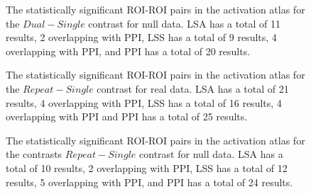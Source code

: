 \documentclass[phd,figures,tables,ackpage,abstractpage,publicabstractpage]{uithesis}
\begin{document}
\begin{figure}[H]
  \ContinuedFloat
  \centering


  \caption[All contrasts for all atlases for all data for LSA/LSS versus PPI continued...]{
      The statistically significant ROI-ROI pairs in the activation atlas
      for the $Dual - Single$ contrast for null data.
      LSA has a total of 11 results, 2 overlapping with PPI,
      LSS has a total of 9 results, 4 overlapping with PPI,
      and PPI has a total of 20 results.
  }
  \label{fig:data-null_type-brain_atlas-activation_contrast-dualxsingle}
\end{figure}

\begin{figure}[H]
  \ContinuedFloat
  \centering


  \caption[All contrasts for all atlases for all data for LSA/LSS versus PPI continued...]{
      The statistically significant ROI-ROI pairs in the activation atlas
      for the $Repeat - Single$ contrast for real data.
      LSA has a total of 21 results, 4 overlapping with PPI,
      LSS has a total of 16 results, 4 overlapping with PPI and
      PPI has a total of 25 results.
  }
  \label{fig:data-real_type-brain_atlas-activation_contrast-repeatxsingle}
\end{figure}

\begin{figure}[H]
  \ContinuedFloat
  \centering


  \caption[All contrasts for all atlases for all data for LSA/LSS versus PPI continued...]{
      The statistically significant ROI-ROI pairs in the activation atlas
      for the contrasts $Repeat - Single$ contrast for null data.
      LSA has a total of 10 results, 2 overlapping with PPI,
      LSS has a total of 12 results, 5 overlapping with PPI,
      and PPI has a total of 24 results.
  }
  \label{fig:data-null_type-brain_atlas-activation_contrast-repeatxsingle}
\end{figure}
\end{document}
